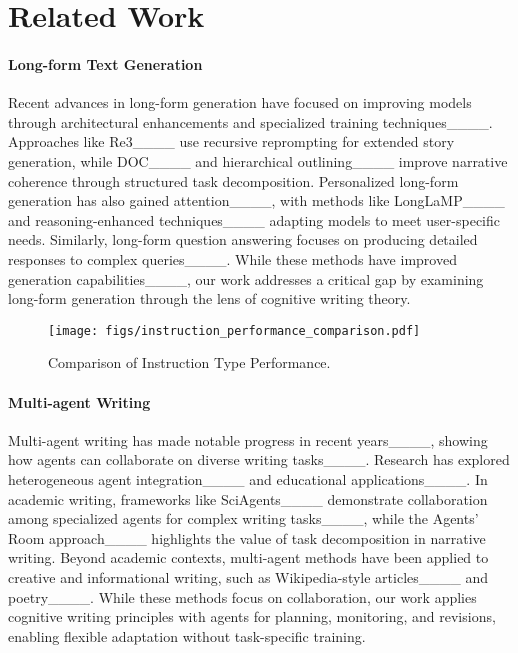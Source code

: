 \section{Related Work}
\paragraph{Long-form Text Generation}
Recent advances in long-form generation have focused on improving models through architectural enhancements and specialized training techniques____. Approaches like Re3____ use recursive reprompting for extended story generation, while DOC____ and hierarchical outlining____ improve narrative coherence through structured task decomposition. Personalized long-form generation has also gained attention____, with methods like LongLaMP____ and reasoning-enhanced techniques____ adapting models to meet user-specific needs. Similarly, long-form question answering focuses on producing detailed responses to complex queries____. While these methods have improved generation capabilities____, our work addresses a critical gap by examining long-form generation through the lens of cognitive writing theory.


\begin{figure}[t!]
\centering
  \texttt{[image: figs/instruction\_performance\_comparison.pdf]} 
  \caption {Comparison of Instruction Type Performance.}
  \label{compt}
\end{figure}

\paragraph{Multi-agent Writing}
Multi-agent writing has made notable progress in recent years____, showing how agents can collaborate on diverse writing tasks____. Research has explored heterogeneous agent integration____ and educational applications____. In academic writing, frameworks like SciAgents____ demonstrate collaboration among specialized agents for complex writing tasks____, while the Agents’ Room approach____ highlights the value of task decomposition in narrative writing.
Beyond academic contexts, multi-agent methods have been applied to creative and informational writing, such as Wikipedia-style articles____ and poetry____. 
While these methods focus on collaboration, our work applies cognitive writing principles with agents for planning, monitoring, and revisions, enabling flexible adaptation without task-specific training.